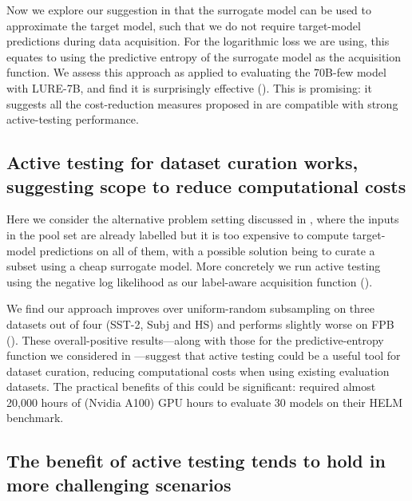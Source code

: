 Now we explore our suggestion in  that the surrogate model can be used to approximate the target model, such that we do not require target-model predictions during data acquisition.
For the logarithmic loss we are using, this equates to using the predictive entropy of the surrogate model as the acquisition function.
We assess this approach as applied to evaluating the 70B-few model with LURE-7B, and find it is surprisingly effective ().
This is promising: it suggests all the cost-reduction measures proposed in  are compatible with strong active-testing performance.





\subsection{Active testing for dataset curation works, suggesting scope to reduce computational costs}\label{sec:dataset_curation}

Here we consider the alternative problem setting discussed in , where the inputs in the pool set are already labelled but it is too expensive to compute target-model predictions on all of them, with a possible solution being to curate a subset using a cheap surrogate model.
More concretely we run active testing using the negative log likelihood as our label-aware acquisition function ().

We find our approach improves over uniform-random subsampling on three datasets out of four (SST-2, Subj and HS) and performs slightly worse on FPB ().
These overall-positive results---along with those for the predictive-entropy function we considered in ---suggest that active testing could be a useful tool for dataset curation, reducing computational costs when using existing evaluation datasets.
The practical benefits of this could be significant: \citet{liang2023holistic} required almost 20,000 hours of (Nvidia A100) GPU hours to evaluate 30 models on their HELM benchmark.


\subsection{The benefit of active testing tends to hold in more challenging scenarios}\label{sec:mmlu}

